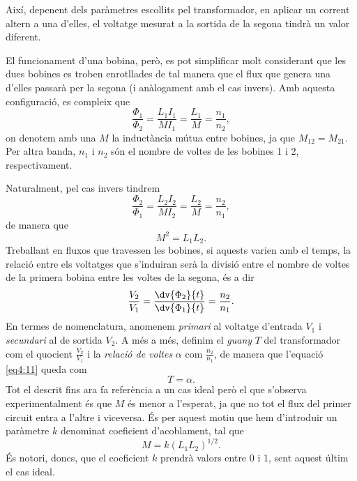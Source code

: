 \documentclass[a4paper,10.5pt]{report}
\begin{document}
Així, depenent dels paràmetres escollits pel transformador, en aplicar un corrent altern a una d'elles, el voltatge mesurat a la sortida de la segona tindrà un valor diferent.

El funcionament d'una bobina, però, es pot simplificar molt considerant que les dues bobines es troben enrotllades de tal manera que el flux que genera una d'elles passarà per la segona (i anàlogament amb el cas invers). Amb aquesta configuració, es compleix que
\begin{equation}
	\frac{\Phi_1}{\Phi_2}=\frac{L_1I_1}{MI_1}=\frac{L_1}{M}=\frac{n_1}{n_2}, \label{eq:4:8}
\end{equation}
on denotem amb una $M$ la inductància mútua entre bobines, ja que $M_{12}=M_{21}$. Per altra banda, $n_1$ i $n_2$ són el nombre de voltes de les bobines 1 i 2, respectivament.

Naturalment, pel cas invers tindrem
\begin{equation}
	\frac{\Phi_2}{\Phi_1}=\frac{L_2I_2}{MI_2}=\frac{L_2}{M}=\frac{n_2}{n_1}, \label{eq:4:9}
\end{equation}
de manera que
\begin{equation}
	M^2=L_1L_2. \label{eq:4:10}
\end{equation}
Treballant en fluxos que travessen les bobines, si aquests varien amb el temps, la relació entre els voltatges que s'induiran serà la divisió entre el nombre de voltes de la primera bobina entre les voltes de la segona, és a dir
\begin{equation}
	\frac{V_2}{V_1}=\frac{\dv{\Phi_2}{t}}{\dv{\Phi_1}{t}}=\frac{n_2}{n_1}. \label{eq4:11}
\end{equation}
En termes de nomenclatura, anomenem \textit{primari} al voltatge d'entrada $V_1$ i \textit{secundari} al de sortida $V_2$. A més a més, definim el \textit{guany}  $T$ del transformador com el quocient $\frac{V_2}{V_1}$ i la \textit{relació de voltes} $\alpha$ com $\frac{n_2}{n_1}$, de manera que l'equació \eqref{eq4:11} queda com
\begin{equation}
	T = \alpha. \label{eq:4.transf}
\end{equation}
Tot el descrit fins ara fa referència a un cas ideal però el que s'observa experimentalment és que $M$ és menor a l'esperat, ja que no tot el flux del primer circuit entra a l'altre i viceversa. És per aquest motiu que hem d'introduir un paràmetre $k$ denominat coeficient d'acoblament, tal que
\begin{equation}
	M=k(L_1L_2)^{1/2}. \label{eq4:12}
\end{equation}
És notori, doncs, que el coeficient $k$ prendrà valors entre 0 i 1, sent aquest últim el cas ideal.
\end{document}
